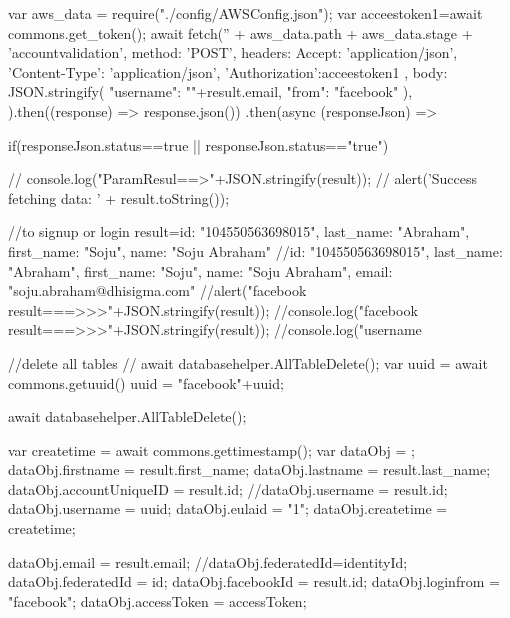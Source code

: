 {{{{{{{{                 
                  var aws_data = require("./config/AWSConfig.json");
                  var acceestoken1=await commons.get_token();
                  await fetch('' + aws_data.path + aws_data.stage + 'accountvalidation', {
                    method: 'POST',
                    headers: {
                      Accept: 'application/json',
                      'Content-Type': 'application/json',
                      'Authorization':acceestoken1
                    },
                    body: JSON.stringify({
                      "username": ""+result.email,
                      "from": "facebook"
                    }),
                  }).then((response) => response.json())
                    .then(async (responseJson) => {
                   
                      if(responseJson.status==true || responseJson.status=="true")
                      {
                  //  console.log("ParamResul==>"+JSON.stringify(result));
                  //   alert('Success fetching data: ' + result.toString());

                  //to signup or login  result={id: "104550563698015", last_name: "Abraham", first_name: "Soju", name: "Soju Abraham"}
                  //{id: "104550563698015", last_name: "Abraham", first_name: "Soju", name: "Soju Abraham", email: "soju.abraham@dhisigma.com"}
                  //alert("facebook result===>>>"+JSON.stringify(result));
                  //console.log("facebook result===>>>"+JSON.stringify(result));
                  //console.log("username%


                  //delete all tables 
                  // await databasehelper.AllTableDelete();
                  var uuid = await commons.getuuid()
                      uuid = "facebook"+uuid;

                  await databasehelper.AllTableDelete();

                  var createtime = await commons.gettimestamp();
                  var dataObj = {};
                  dataObj.firstname = result.first_name;
                  dataObj.lastname = result.last_name;
                  dataObj.accountUniqueID = result.id;
                  //dataObj.username = result.id;
                  dataObj.username = uuid;
                  dataObj.eulaid = "1";
                  dataObj.createtime = createtime;

                  dataObj.email = result.email;
                  //dataObj.federatedId=identityId;
                  dataObj.federatedId = id;
                  dataObj.facebookId = result.id;
                  dataObj.loginfrom = "facebook";
                  dataObj.accessToken = accessToken;

}}}}}}}}}}

